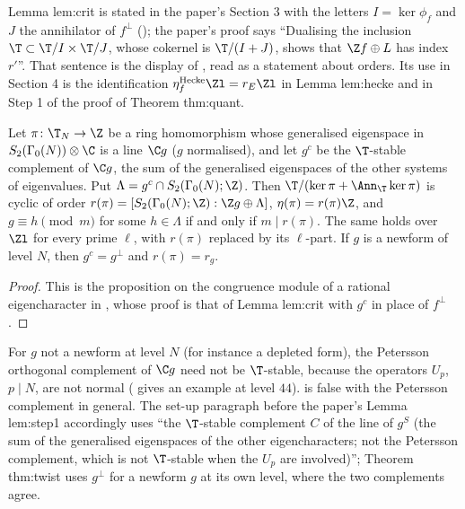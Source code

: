 \begin{paperlink}
Lemma lem:crit is stated in the paper's Section 3 with the letters $I=\ker\phi_f$ and $J$ the annihilator of $f^\perp$ (); the paper's proof says
``Dualising the inclusion $\T\subset\T/I\times\T/J$, whose cokernel is $\T/(I+J)$, shows that $\Z f\oplus L$ has index $r'$''. That sentence is the display of
, read as a statement about orders. Its use in Section 4 is the identification $\eta^{\mathrm{Hecke}}_f\Zl=r_E\Zl$ in Lemma lem:hecke and in Step 1 of the proof of Theorem thm:quant.
\end{paperlink}

\begin{proposition}\label{prop:congruence:crit-general}
Let $\pi\colon\T_N\to\Z$ be a ring homomorphism whose generalised eigenspace in $S_2(\Gamma_0(N))\otimes\C$ is a line $\C g$ ($g$ normalised), and let $g^c$ be the $\T$-stable complement of
$\C g$, the sum of the generalised eigenspaces of the other systems of eigenvalues. Put $\Lambda=g^c\cap S_2(\Gamma_0(N);\Z)$. Then $\T/(\ker\pi+\Ann_\T\ker\pi)$ is cyclic of order
$r(\pi)=[S_2(\Gamma_0(N);\Z):\Z g\oplus\Lambda]$, $\eta(\pi)=r(\pi)\Z$, and $g\equiv h\pmod m$ for some $h\in\Lambda$ if and only if $m\mid r(\pi)$. The same holds over $\Zl$ for every prime $\ell$, with
$r(\pi)$ replaced by its $\ell$-part. If $g$ is a newform of level $N$, then $g^c=g^\perp$ and $r(\pi)=r_g$.
\end{proposition}

\begin{proof}
This is the proposition on the congruence module of a rational eigencharacter in , whose proof is that of Lemma lem:crit with $g^c$ in place of $f^\perp$.
\end{proof}

\begin{warning}\label{warn:congruence:complement}
For $g$ not a newform at level $N$ (for instance a depleted form), the Petersson orthogonal complement of $\C g$ need not be $\T$-stable, because the operators $U_p$, $p\mid N$, are
not normal ( gives an example at level $44$).  is false with the Petersson complement in general. The set-up paragraph before the paper's
Lemma lem:step1 accordingly uses ``the $\T$-stable complement $C$ of the line of $g^S$ (the sum of the generalised eigenspaces of the other eigencharacters; not the Petersson complement, which is
not $\T$-stable when the $U_p$ are involved)''; Theorem thm:twist uses $g^\perp$ for a newform $g$ at its own level, where the two complements agree.
\end{warning}


